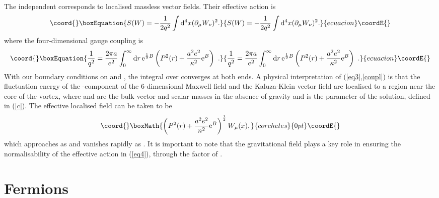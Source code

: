 \documentclass[a4paper,12pt]{article}
\begin{document}
The \coordHE{} independent \coordHE{} corresponds to localised massless vector
fields. Their effective action is 
\begin{equation}\coord{}\boxEquation{
S(W)= -\frac{1}{2 q^2} \int{\rm d}^4x(\partial_\mu 
W_\nu)^2.
\label{eq3}
}{
S(W)= -\frac{1}{2 q^2} \int{\rm d}^4x(\partial_\mu 
W_\nu)^2.
}{ecuacion}\coordE{}\end{equation}
 where the four-dimensional gauge coupling is
\begin{equation}\coord{}\boxEquation{
\frac{1}{q^2}=
{2\pi a\over e^2}\int_0^\infty{\rm d}r\,{\rm e}^{{1\over 2}B}
\left(P^2(r)+{a^2e^2\over \kappa^2}{\rm e}^B\right)~.
\label{coupl}
}{
\frac{1}{q^2}=
{2\pi a\over e^2}\int_0^\infty{\rm d}r\,{\rm e}^{{1\over 2}B}
\left(P^2(r)+{a^2e^2\over \kappa^2}{\rm e}^B\right)~.
}{ecuacion}\coordE{}\end{equation}
With our boundary conditions on \coordHE{} and \coordHE{}, the integral over
\coordHE{} converges at both ends.  A physical interpretation of
(\ref{eq3},\ref{coupl}) is that the fluctuation energy of the
\myHighlight{$\mu$}\coordHE{}-component of the 6-dimensional Maxwell field and the
Kaluza-Klein vector field  \coordHE{} are localised to a region
\coordHE{} near the core of the vortex, where
\coordHE{} and \coordHE{} are the bulk vector and scalar masses in the
absence of gravity and \coordHE{} is the parameter of the solution, defined
in (\ref{c}). The effective localised field can be taken to be
\[\coord{}\boxMath{
 \left(P^2(r)+{a^2e^2\over n^2}{\rm e}^B\right)^{1\over 2}
W_\mu(x),
}{corchetes}{0pt}\coordE{}\]
which approaches \coordHE{} as \coordHE{} and vanishes rapidly as
\coordHE{}. It is important to note that the gravitational field
plays a key role in ensuring the normalisability of the effective
action in (\ref{eq4}), through the factor of 
\coordHE{}. 
 
\section{Fermions} 
\end{document}
